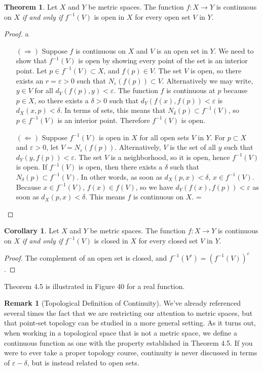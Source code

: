\documentclass{article}
\theoremstyle{definition}
\newtheorem{theorem}{Theorem}[section]
\newtheorem{corollary}{Corollary}[section]
\newtheorem{remark}{Remark}[section]
\begin{document}
	\begin{theorem}
		Let $ X $ and $ Y $ be metric spaces. The function $ f:X\to Y $ is continuous on $ X $ \textit{if and only if} $ f^{-1}(V) $ is open in $ X $ for every open set $ V $ in $ Y $.
	\end{theorem}
	\begin{proof}
		{\color{white}a}
		\begin{enumerate}
			\item [$ (\Longrightarrow) $] Suppose $ f $ is continuous on $ X $ and $ V$ is an open set in $ Y $. We need to show that $ f^{-1}(V) $ is open by showing every point of the set is an interior point. Let $ p\in f^{-1}(V)\subset X $, and $ f(p)\in V $. The set $ V $ is open, so there exists an $ r=\varepsilon>0 $ such that $ N_\varepsilon(f(p))\subset V $. Alternatively we may write, $ y\in V $ for all $ d_Y(f(p),y)<\varepsilon $. The function $ f $ is continuous at $ p $ because $ p\in X $, so there exists a $ \delta>0 $ such that $ d_Y(f(x),f(p))<\varepsilon $ is $ d_X(x,p)<\delta $. In terms of sets, this means that $ N_\delta(p)\subset f^{-1}(V) $, so $ p\in f^{-1}(V) $ is an interior point. Therefore $ f^{-1}(V) $ is open.
			\item [$ (\Longleftarrow) $] Suppose $ f^{-1}(V) $ is open in $ X $ for all open sets $ V $ in $ Y $. For $ p\subset X $ and $ \varepsilon>0 $, let $ V=N_\varepsilon(f(p)) $. Alternatively, $ V $ is the set of all $ y $ such that $ d_Y(y,f(p))<\varepsilon $. The set $ V $ is a neighborhood, so it is open, hence $ f^{-1}(V) $ is open. If $ f^{-1}(V) $ is open, then there exists a $ \delta $ such that $ N_\delta(p)\subset f^{-1}(V) $. In other words, as soon as $ d_X(p,x)<\delta $, $ x\in f^{-1}(V) $. Because $ x\in f^{-1}(V) $, $ f(x)\in f(V) $, so we have $ d_Y(f(x),f(p))<\varepsilon $ as soon as $ d_X(p,x)<\delta $. This means $ f $ is continuous on $ X $. =
		\end{enumerate}
	\end{proof}
	\begin{corollary}
		Let $ X $ and $ Y $ be metric spaces. The function $ f:X\to Y $ is continuous on $ X $ \textit{if and only if} $ f^{-1}(V) $ is closed in $ X $ for every closed set $ V $ in $ Y $.
	\end{corollary}
	\begin{proof}
		The complement of an open set is closed, and $ f^{-1}(V^c)=(f^{-1}(V))^c $. 
	\end{proof}
	Theorem 4.5 is illustrated in Figure 40 for a real function. 
	\begin{remark}[Topological Definition of Continuity]
		We've already referenced several times the fact that we are restricting our attention to metric spaces, but that point-set topology can be studied in a more general setting. As it turns out, when working in a topological space that is not a metric space, we define a continuous function as one with the property established in Theorem 4.5. If you were to ever take a proper topology course, continuity is never discussed in terms of $ \varepsilon-\delta $, but is instead related to open sets.
	\end{remark}
\end{document}
